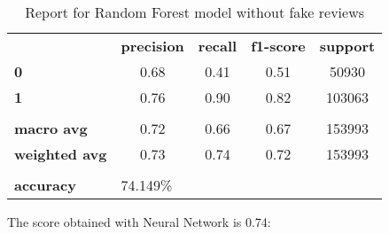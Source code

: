 \begin{table}[h!]
    \centering
    \begin{tabular}{lcccc}
        \rowcolor[HTML]{EEEEEE} 
        \cellcolor[HTML]{FBFBFB} & \textbf{precision} & \textbf{recall} & \textbf{f1-score} & \textbf{support} \\
        \rowcolor[HTML]{EEEEEE} 
        \textbf{0}               & 0.68               & 0.41            & 0.51              & 50930            \\
        \rowcolor[HTML]{EEEEEE} 
        \textbf{1}               & 0.76               & 0.90            & 0.82              & 103063           \\
        \rowcolor[HTML]{FBFBFB} 
        &                    &                 &                   &                  \\
        \rowcolor[HTML]{EEEEEE} 
        \textbf{macro avg}       & 0.72               & 0.66            & 0.67              & 153993           \\
        \rowcolor[HTML]{EEEEEE} 
        \textbf{weighted avg}    & 0.73               & 0.74            & 0.72              & 153993           \\
        \rowcolor[HTML]{FBFBFB} 
        &                    &                 &                   &                  \\
        \rowcolor[HTML]{EEEEEE} 
        \textbf{accuracy}        & \multicolumn{4}{l}{\cellcolor[HTML]{EEEEEE}74.149\%}                         
    \end{tabular}
    \caption{Report for Random Forest model without fake reviews}
    \label{tab:rf-res-no-fake}
\end{table}

The score obtained with Neural Network is 0.74:

